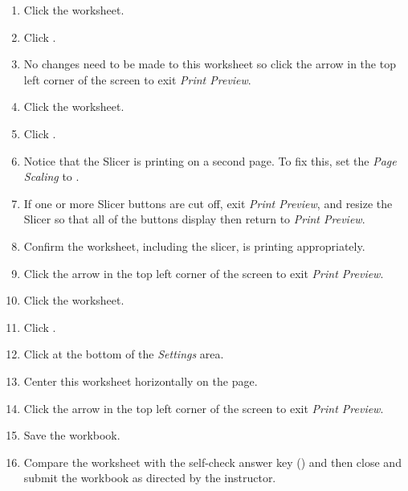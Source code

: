 \begin{enumbox}
	\begin{enumerate}
		\item Click the  worksheet.
		\item Click .
		\item No changes need to be made to this worksheet so click the arrow in the top left corner of the screen to exit \textit{Print Preview}.
	
		\item Click the  worksheet.
		\item Click .
		\item Notice that the Slicer is printing on a second page. To fix this, set the \textit{Page Scaling} to .
		\item If one or more Slicer buttons are cut off, exit \textit{Print Preview}, and resize the Slicer so that all of the buttons display then return to \textit{Print Preview}.
		\item Confirm the worksheet, including the slicer, is printing appropriately. 
		\item Click the arrow in the top left corner of the screen to exit \textit{Print Preview}.
	
		\item Click the  worksheet.
		\item Click .
		\item Click  at the bottom of the \textit{Settings} area.
		\item Center this worksheet horizontally on the page. 
		\item Click the arrow in the top left corner of the screen to exit \textit{Print Preview}.
	
		\item Save the  workbook.
		\item Compare the worksheet with the self-check answer key () and then close and submit the  workbook as directed by the instructor.
	\end{enumerate}
\end{enumbox}
	
